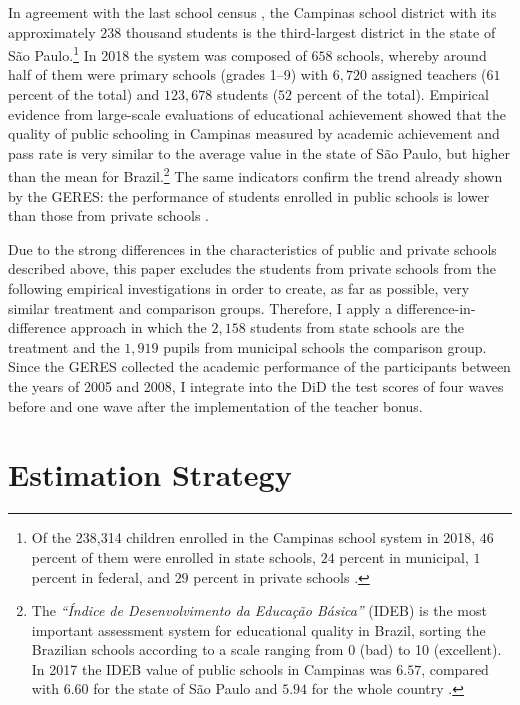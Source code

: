 \documentclass[a4paper, 12pt]{article}
\begin{document}
In agreement with the last school census \citep[see][]{Sinopse2018}, the Campinas school district with its approximately $238$ thousand students is the third-largest district in the state of São Paulo.\footnote{Of the 238,314 children enrolled in the Campinas school system in 2018, $46$ percent of them were enrolled in state schools, $24$ percent in municipal, $1$ percent in federal, and $29$ percent in private schools \citep{Sinopse2018}.} In 2018 the system was composed of $658$ schools, whereby around half of them were primary schools (grades 1–9) with $6,720$ assigned teachers ($61$ percent of the total) and $123,678$ students ($52$ percent of the total). Empirical evidence from large-scale evaluations of educational achievement showed that the quality of public schooling in Campinas \textemdash measured by academic achievement and pass rate \textemdash is very similar to the average value in the state of São Paulo, but higher than the mean for Brazil.\footnote{The \textit{``Índice de Desenvolvimento da Educação Básica''} (IDEB) is the most important assessment system for educational quality in Brazil, sorting the Brazilian schools according to a scale ranging from 0 (bad) to 10 (excellent). In 2017 the IDEB value of public schools in Campinas was $6.57$, compared with $6.60$ for the state of São Paulo and $5.94$ for the whole country \citep[see][]{IDEB2019}.} The same indicators confirm the trend already shown by the GERES: the performance of students enrolled in public schools is lower than those from private schools \citep[see][]{IDEB2019}.


Due to the strong differences in the characteristics of public and private schools described above, this paper excludes the students from private schools from the following empirical investigations in order to create, as far as possible, very similar treatment and comparison groups. Therefore, I apply a difference-in-difference approach in which the $2,158$ students from state schools are the treatment and the $1,919$ pupils from municipal schools the comparison group. Since the GERES collected the academic performance of the participants between the years of 2005 and 2008, I integrate into the DiD the test scores of four waves before and one wave after the implementation of the teacher bonus.




\section{Estimation Strategy} \label{Paper3-Methodology}
\end{document}
